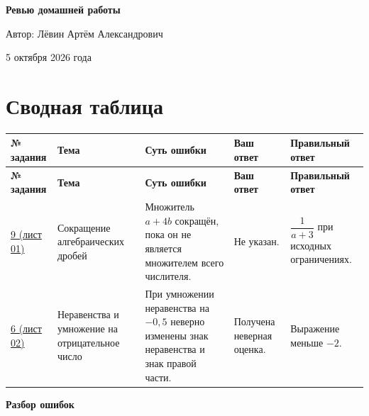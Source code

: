 \documentclass[12pt,a4paper]{article}
\begin{document}
\begin{titlepage}
\thispagestyle{empty}
\begin{center}
\vspace*{0.23\textheight}
{\Huge\bfseries Ревью домашней работы\par}
\vspace{2.2cm}
{\Large Автор: Лёвин Артём Александрович\par}
\vspace{0.8cm}
{\large 5 октября 2026 года\par}
\vfill
{}
\end{center}
\end{titlepage}

\newpage
\section*{Сводная таблица}
\small
\begin{longtable}{>{\raggedright\arraybackslash}p{1.6cm}
                  >{\raggedright\arraybackslash}p{2.8cm}
                  >{\raggedright\arraybackslash}p{4.4cm}
                  >{\raggedright\arraybackslash}p{3.2cm}
                  >{\raggedright\arraybackslash}p{3.2cm}}
\toprule
\textbf{№ задания} & \textbf{Тема} & \textbf{Суть ошибки} & \textbf{Ваш ответ} & \textbf{Правильный ответ} \\
\midrule
\endfirsthead
\toprule
\textbf{№ задания} & \textbf{Тема} & \textbf{Суть ошибки} & \textbf{Ваш ответ} & \textbf{Правильный ответ} \\
\midrule
\endhead
\hyperref[task:01-9]{9 (лист 01)} &
Сокращение алгебраических дробей &
Множитель $a+4b$ сокращён, пока он не является множителем всего числителя. &
Не указан. &
$\dfrac{1}{a+3}$ при исходных ограничениях. \\
\midrule
\hyperref[task:02-6]{6 (лист 02)} &
Неравенства и умножение на отрицательное число &
При умножении неравенства на $-0{,}5$ неверно изменены знак неравенства и знак правой части. &
Получена неверная оценка. &
Выражение меньше $-2$. \\
\bottomrule
\end{longtable}
\normalsize

\newpage
\thispagestyle{empty}
\vspace*{\fill}
\begin{center}
{\Huge\bfseries Разбор ошибок}
\end{center}
\vspace*{\fill}
\end{document}
